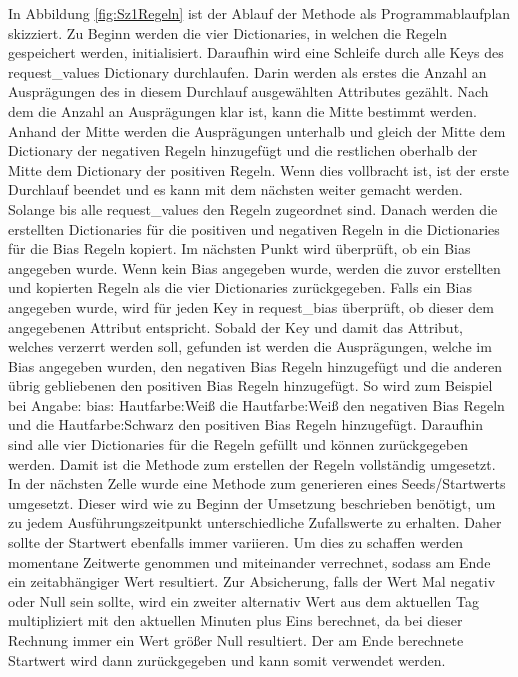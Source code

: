 \begin{onehalfspace}
In Abbildung \ref{fig:Sz1Regeln} ist der Ablauf der Methode als Programmablaufplan skizziert. Zu Beginn werden die vier Dictionaries, in welchen die Regeln gespeichert werden, initialisiert. Daraufhin wird eine Schleife durch alle Keys des \glqq{}request\_values\grqq{} Dictionary durchlaufen. Darin werden als erstes die Anzahl an Ausprägungen des in diesem Durchlauf ausgewählten Attributes gezählt. Nach dem die Anzahl an Ausprägungen klar ist, kann die Mitte bestimmt werden. Anhand der Mitte werden die Ausprägungen unterhalb und gleich der Mitte dem Dictionary der negativen Regeln hinzugefügt und die restlichen oberhalb der Mitte dem Dictionary der positiven Regeln. Wenn dies vollbracht ist, ist der erste Durchlauf beendet und es kann mit dem nächsten weiter gemacht werden. Solange bis alle \glqq{}request\_values\grqq{} den Regeln zugeordnet sind. Danach werden die erstellten Dictionaries für die positiven und negativen Regeln in die Dictionaries für die Bias Regeln kopiert.
Im nächsten Punkt wird überprüft, ob ein Bias angegeben wurde. Wenn kein Bias angegeben wurde, werden die zuvor erstellten und kopierten Regeln als die vier Dictionaries zurückgegeben. Falls ein Bias angegeben wurde, wird für jeden Key in \glqq{}request\_bias\grqq{} überprüft, ob dieser dem angegebenen Attribut entspricht. Sobald der Key und damit das Attribut, welches verzerrt werden soll, gefunden ist werden die Ausprägungen, welche im Bias angegeben wurden, den negativen Bias Regeln hinzugefügt und die anderen übrig gebliebenen den positiven Bias Regeln hinzugefügt. So wird zum Beispiel bei Angabe: \glqq{}bias: Hautfarbe:Weiß\grqq{} die Hautfarbe:Weiß den negativen Bias Regeln und die Hautfarbe:Schwarz den positiven Bias Regeln hinzugefügt. Daraufhin sind alle vier Dictionaries für die Regeln gefüllt und können zurückgegeben werden.
Damit ist die Methode zum erstellen der Regeln vollständig umgesetzt.
In der nächsten Zelle wurde eine Methode zum generieren eines Seeds/Startwerts umgesetzt. Dieser wird wie zu Beginn der Umsetzung beschrieben benötigt, um zu jedem Ausführungszeitpunkt unterschiedliche Zufallswerte zu erhalten. Daher sollte der Startwert ebenfalls immer variieren. Um dies zu schaffen werden momentane Zeitwerte genommen und miteinander verrechnet, sodass am Ende ein zeitabhängiger Wert resultiert. Zur Absicherung, falls der Wert Mal negativ oder Null sein sollte, wird ein zweiter alternativ Wert aus dem aktuellen Tag multipliziert mit den aktuellen Minuten plus Eins berechnet, da bei dieser Rechnung immer ein Wert größer Null resultiert. Der am Ende berechnete Startwert wird dann zurückgegeben und kann somit verwendet werden.    

\end{onehalfspace}
